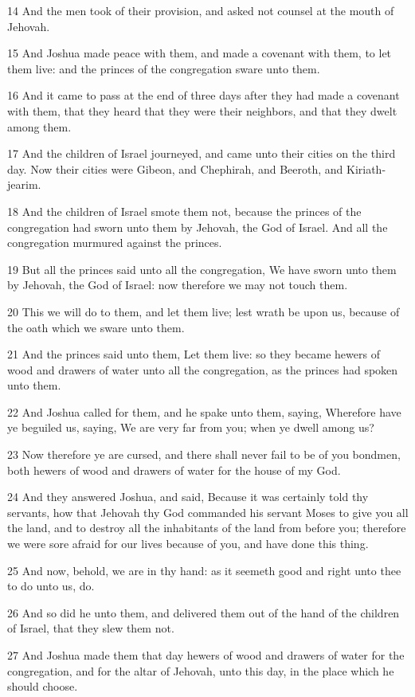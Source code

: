 \par 14 And the men took of their provision, and asked not counsel at the mouth of Jehovah.
\par 15 And Joshua made peace with them, and made a covenant with them, to let them live: and the princes of the congregation sware unto them.
\par 16 And it came to pass at the end of three days after they had made a covenant with them, that they heard that they were their neighbors, and that they dwelt among them.
\par 17 And the children of Israel journeyed, and came unto their cities on the third day. Now their cities were Gibeon, and Chephirah, and Beeroth, and Kiriath-jearim.
\par 18 And the children of Israel smote them not, because the princes of the congregation had sworn unto them by Jehovah, the God of Israel. And all the congregation murmured against the princes.
\par 19 But all the princes said unto all the congregation, We have sworn unto them by Jehovah, the God of Israel: now therefore we may not touch them.
\par 20 This we will do to them, and let them live; lest wrath be upon us, because of the oath which we sware unto them.
\par 21 And the princes said unto them, Let them live: so they became hewers of wood and drawers of water unto all the congregation, as the princes had spoken unto them.
\par 22 And Joshua called for them, and he spake unto them, saying, Wherefore have ye beguiled us, saying, We are very far from you; when ye dwell among us?
\par 23 Now therefore ye are cursed, and there shall never fail to be of you bondmen, both hewers of wood and drawers of water for the house of my God.
\par 24 And they answered Joshua, and said, Because it was certainly told thy servants, how that Jehovah thy God commanded his servant Moses to give you all the land, and to destroy all the inhabitants of the land from before you; therefore we were sore afraid for our lives because of you, and have done this thing.
\par 25 And now, behold, we are in thy hand: as it seemeth good and right unto thee to do unto us, do.
\par 26 And so did he unto them, and delivered them out of the hand of the children of Israel, that they slew them not.
\par 27 And Joshua made them that day hewers of wood and drawers of water for the congregation, and for the altar of Jehovah, unto this day, in the place which he should choose.


